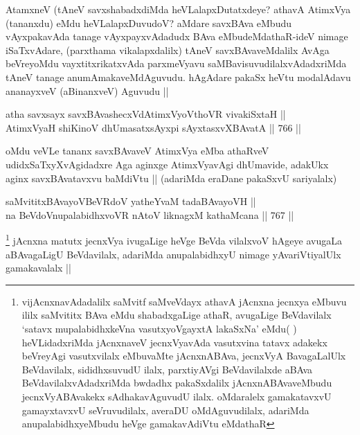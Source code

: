 \begin{artha}
AtamxneV (tAneV savxshabadxdiMda heVLalapxDutatxdeye? athavA AtimxVya (tananxdu) eMdu heVLalapxDuvudoV? aMdare savxBAva eMbudu vAyxpakavAda tanage vAyxpayxvAdadudx BAva eMbudeMdathaR-ideV nimage iSaTxvAdare, (parxthama vikalapxdalilx) tAneV savxBAvaveMdalilx AvAga beVreyoMdu vayxtitxrikatxvAda parxmeVyavu saMBavisuvudilalxvAdadxriMda tAneV tanage anumAmakaveMdAguvudu. hAgAdare pakaSx heVtu modalAdavu ananayxveV (aBinanxveV) Aguvudu ||
\end{artha}

\begin{shl}
atha savxsayx savxBAvashecxVdAtimxVyoV\s thoVR vivakiSxtaH || \\
AtimxVyaH shiKinoV dhUmasatxsAyxpi sAyxtasxvXBAvatA ||  766 ||  
\end{shl}

\begin{artha}
oMdu veVLe tananx savxBAvaveV AtimxVya eMba athaRveV udidxSaTxyXvAgidadxre Aga aginxge AtimxVyavAgi dhUmavide, adakUkx aginx savxBAvatavxvu baMdiVtu ||
(adariMda eraDane pakaSxvU sariyalalx)
\end{artha}


\begin{shl}
saMvititxBAvayoVBeVRdoV yatheYvaM tadaBAvayoVH || \\
na BeVdoV\s nupalabidhxvoVR nAtoV liknagxM kathaMcana ||  767 ||  
\end{shl}

\begin{artha}
\footnote{vijAcnxnavAdadalilx saMvitf saMveVdayx athavA jAcnxna jecnxya eMbuvu ililx saMvititx BAva eMdu shabadxgaLige athaR, avugaLige BeVdavilalx `satavx mupalabidhxkeVna vasutxyoVgayxtA lakaSxNa' eMdu( ) heVLidadxriMda jAcnxnaveV jecnxVyavAda vasutxvina tatavx adakekx beVreyAgi vasutxvilalx eMbuvaMte jAcnxnABAva, jecnxVyA BavagaLalUlx BeVdavilalx, sididhxsuvudU ilalx, parxtiyAVgi BeVdavilalxde aBAva BeVdavilalxvAdadxriMda bwdadhx pakaSxdalilx jAcnxnABAvaveMbudu jecnxVyABAvakekx sAdhakavAguvudU ilalx. oMdaralelx gamakatavxvU gamayxtavxvU seVruvudilalx, averaDU oMdAguvudilalx, adariMda anupalabidhxyeMbudu heVge gamakavAdiVtu eMdathaR}
jAcnxna matutx jecnxVya ivugaLige heVge BeVda vilalxvoV hAgeye avugaLa aBAvagaLigU BeVdavilalx, adariMda anupalabidhxyU nimage yAvariVtiyalUlx gamakavalalx ||
\end{artha}

